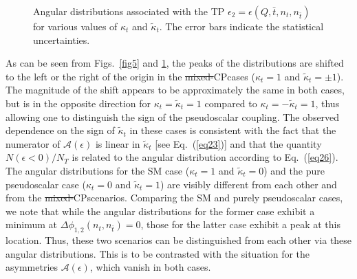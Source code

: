 \documentclass[aps,preprint,tightenlines,floatfix,superscriptaddress,nofootinbib,showpacs]{revtex4-1}
\def\tbar{\bar{t}}
\def\kp{\kappa_t}
\def\kpt{\tilde{\kappa}_t}
\def\TPb{\epsilon(Q,\tbar,n_t,n_{\tbar})}
\providecommand{\DIFadd}[1]{{\protect\color{blue}\uwave{#1}}} %
\providecommand{\DIFdel}[1]{{\protect\color{red}\sout{#1}}}                      %
\providecommand{\DIFaddbegin}{} %
\providecommand{\DIFaddend}{} %
\providecommand{\DIFdelbegin}{} %
\providecommand{\DIFdelend}{} %
\begin{document}
\begin{center}
\begin{figure}[H]
\hspace*{0.002\textwidth}
\caption{Angular distributions associated with the TP $\epsilon_2 = \TPb$ for
  various values of $\kp$ and $\kpt$. The error bars indicate the statistical
  uncertainties.}
\label{fig6}
\end{figure}
\end{center}
\par As can be seen from Figs.~\ref{fig5} and \ref{fig6}, the
peaks of the 
distributions are shifted to the left or the right of the origin
in the \DIFdelbegin \DIFdel{mixed-}\DIFdelend $\mathrm{CP}$\DIFaddbegin \DIFadd{-mixed
}\DIFaddend cases ($\kp =1$ and $\kpt=\pm 1$).
The magnitude of the shift appears to be approximately the
same in both cases, but is in the
opposite direction for $\kp=\kpt=1$ compared to $\kp=-\kpt=1$, thus allowing
one to distinguish
the sign of the pseudoscalar coupling. The observed dependence
on the sign of $\kpt$ in these cases
is consistent with the fact that the numerator of $\mathcal{A}(\epsilon)$
is linear in $\kpt$ [see Eq.~(\ref{eq23})]
and that the quantity $N(\epsilon < 0)/N_T$ is related
to the angular distribution according to Eq.~(\ref{eq26}). The angular
distributions for the SM case ($\kp =1$ and $\kpt=0$) and
the pure pseudoscalar case ($\kp =0$ and $\kpt= 1$) are
visibly different from each other and from the \DIFdelbegin \DIFdel{mixed-}\DIFdelend $\mathrm{CP}$\DIFaddbegin \DIFadd{-mixed
}\DIFaddend scenarios. Comparing the SM and purely pseudoscalar cases,
we note that while the angular distributions for the former case
exhibit a minimum at $\Delta\phi_{1,2}(n_t,n_{\tbar})=0$, those
for the latter case exhibit a peak at this location.
Thus, these two scenarios can be distinguished from each other
via these angular distributions.  This is to be contrasted
with the situation for the asymmetries $\mathcal{A}(\epsilon)$, which vanish
in both cases.
\end{document}

